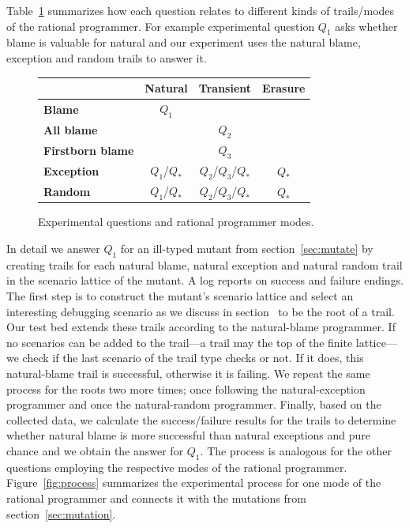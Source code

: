 Table~\ref{fig:experiment-outline} summarizes how each question relates to
different kinds of trails/modes of the rational programmer. For example experimental
question $Q_1$ asks whether blame is valuable for natural and our experiment
uses the natural blame, exception and random trails to answer it.

\begin{figure}[ht]
\center
{\begin{tabular}{l|c|c|c}
                        & {\bf Natural}        & {\bf Transient}          & {\bf Erasure} \\ \hline 
{\bf Blame}             &       $Q_1$          &                          &               \\
{\bf All blame}         &                      &     $Q_2$                &               \\
{\bf Firstborn blame}   &                      &     $Q_3$                &               \\
{\bf Exception}         &       $Q_1$/$Q_*$    &     $Q_2$/$Q_3$/$Q_*$    &      $Q_*$    \\
{\bf Random}            &       $Q_1$/$Q_*$    &     $Q_2$/$Q_3$/$Q_*$    &      $Q_*$    \\
\end{tabular}}
  \caption{ Experimental questions and rational programmer modes.}
  \label{fig:experiment-outline}
\end{figure}


In detail we answer $Q_1$ for an ill-typed mutant from
section~\ref{sec:mutate} by creating trails for each natural blame,
natural exception and natural random trail in the scenario lattice of the mutant. A
log reports on success and failure endings.  The first step is to construct the
mutant's scenario lattice and select an interesting debugging scenario
as we discuss in section~ to be the root of a trail. Our test
bed extends these trails according to the natural-blame programmer.  If no scenarios
can be added to the trail---a trail may the top of the finite lattice---we check if
the last scenario of the trail type checks or not. If it does, this natural-blame
trail is successful, otherwise it is failing. We repeat the same process for the
roots two more times; once following the natural-exception programmer and once the
natural-random programmer. Finally, based on the collected data, we calculate the
success/failure results for the trails to determine whether natural blame is more
successful than natural exceptions and pure chance and we obtain the answer for
$Q_1$.  The process is analogous for the other questions employing the respective
modes of the rational programmer. Figure~\ref{fig:process} summarizes the
experimental process for one mode of the rational programmer and connects
it with the mutations from section~\ref{sec:mutation}.

